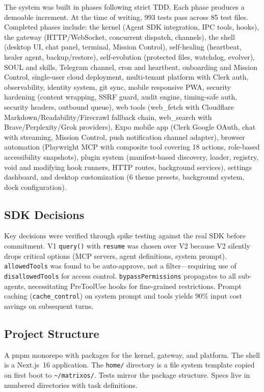 \documentclass[11pt,a4paper]{article}
\begin{document}
The system was built in phases following strict TDD. Each phase produces a demoable increment. At the time of writing, 993 tests pass across 85 test files. Completed phases include: the kernel (Agent SDK integration, IPC tools, hooks), the gateway (HTTP/WebSocket, concurrent dispatch, channels), the shell (desktop UI, chat panel, terminal, Mission Control), self-healing (heartbeat, healer agent, backup/restore), self-evolution (protected files, watchdog, evolver), SOUL and skills, Telegram channel, cron and heartbeat, onboarding and Mission Control, single-user cloud deployment, multi-tenant platform with Clerk auth, observability, identity system, git sync, mobile responsive PWA, security hardening (content wrapping, SSRF guard, audit engine, timing-safe auth, security headers, outbound queue), web tools (web\_fetch with Cloudflare Markdown/Readability/Firecrawl fallback chain, web\_search with Brave/Perplexity/Grok providers), Expo mobile app (Clerk Google OAuth, chat with streaming, Mission Control, push notification channel adapter), browser automation (Playwright MCP with composite tool covering 18 actions, role-based accessibility snapshots), plugin system (manifest-based discovery, loader, registry, void and modifying hook runners, HTTP routes, background services), settings dashboard, and desktop customization (6 theme presets, background system, dock configuration).

\subsection{SDK Decisions}

Key decisions were verified through spike testing against the real SDK before commitment. V1 \texttt{query()} with \texttt{resume} was chosen over V2 because V2 silently drops critical options (MCP servers, agent definitions, system prompt). \texttt{allowedTools} was found to be auto-approve, not a filter---requiring use of \texttt{disallowedTools} for access control. \texttt{bypassPermissions} propagates to all sub-agents, necessitating PreToolUse hooks for fine-grained restrictions. Prompt caching (\texttt{cache\_control}) on system prompt and tools yields 90\% input cost savings on subsequent turns.

\subsection{Project Structure}

A pnpm monorepo with packages for the kernel, gateway, and platform. The shell is a Next.js~16 application. The \texttt{home/} directory is a file system template copied on first boot to \texttt{\textasciitilde/matrixos/}. Tests mirror the package structure. Specs live in numbered directories with task definitions.
\end{document}
